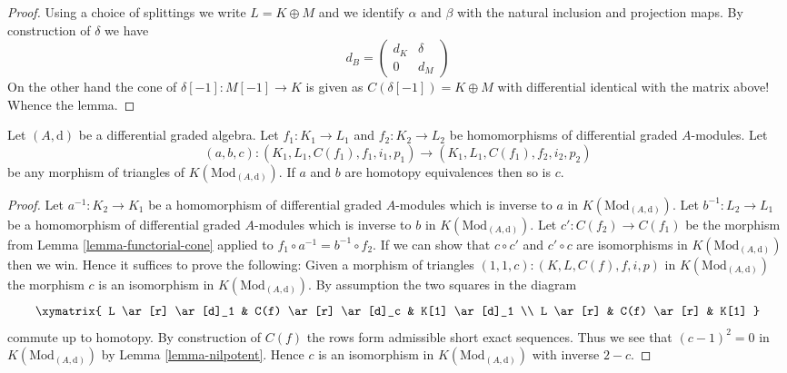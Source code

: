 \begin{proof}
Using a choice of splittings we write $L = K \oplus M$ and we identify
$\alpha$ and $\beta$ with the natural inclusion and projection maps.
By construction of $\delta$ we have
$$
d_B =
\left(
\begin{matrix}
d_K & \delta \\
0 & d_M
\end{matrix}
\right)
$$
On the other hand the cone of $\delta[-1] : M[-1] \to K$
is given as $C(\delta[-1]) = K \oplus M$ with differential identical
with the matrix above! Whence the lemma.
\end{proof}

\begin{lemma}
\label{lemma-third-isomorphism}
Let $(A, \text{d})$ be a differential graded algebra.
Let $f_1 : K_1 \to L_1$ and $f_2 : K_2 \to L_2$ be homomorphisms of
differential graded $A$-modules. Let
$$
(a, b, c) :
(K_1, L_1, C(f_1), f_1, i_1, p_1)
\longrightarrow
(K_1, L_1, C(f_1), f_2, i_2, p_2)
$$
be any morphism of triangles of $K(\text{Mod}_{(A, \text{d})})$.
If $a$ and $b$ are homotopy equivalences then so is $c$.
\end{lemma}

\begin{proof}
Let $a^{-1} : K_2 \to K_1$ be a homomorphism of differential graded $A$-modules
which is inverse to $a$ in $K(\text{Mod}_{(A, \text{d})})$.
Let $b^{-1} : L_2 \to L_1$ be a homomorphism of differential graded $A$-modules
which is inverse to $b$ in $K(\text{Mod}_{(A, \text{d})})$.
Let $c' : C(f_2) \to C(f_1)$ be the morphism from
Lemma \ref{lemma-functorial-cone} applied to
$f_1 \circ a^{-1} = b^{-1} \circ f_2$.
If we can show that $c \circ c'$ and $c' \circ c$ are isomorphisms in
$K(\text{Mod}_{(A, \text{d})})$
then we win. Hence it suffices to prove the following: Given
a morphism of triangles
$(1, 1, c) : (K, L, C(f), f, i, p)$
in $K(\text{Mod}_{(A, \text{d})})$ the morphism $c$ is an isomorphism
in $K(\text{Mod}_{(A, \text{d})})$.
By assumption the two squares in the diagram
$$
\xymatrix{
L \ar[r] \ar[d]_1 &
C(f) \ar[r] \ar[d]_c &
K[1] \ar[d]_1 \\
L \ar[r] &
C(f) \ar[r] &
K[1]
}
$$
commute up to homotopy. By construction of $C(f)$ the rows
form admissible short exact sequences. Thus we see that
$(c - 1)^2 = 0$ in $K(\text{Mod}_{(A, \text{d})})$ by
Lemma \ref{lemma-nilpotent}.
Hence $c$ is an isomorphism in $K(\text{Mod}_{(A, \text{d})})$
with inverse $2 - c$.
\end{proof}

